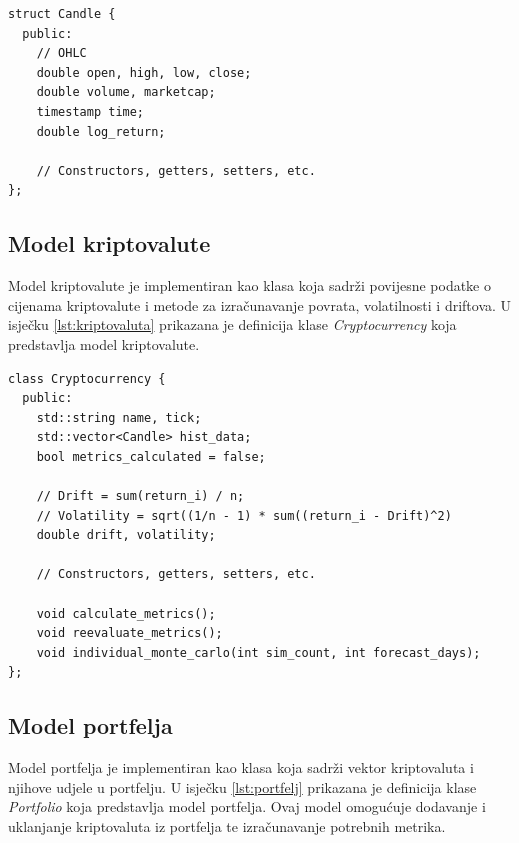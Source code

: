 \documentclass[zavrsnirad, upload]{fer}
\begin{document}
\begin{lstlisting}[caption={Struktura \emph{candle} koja sadrži povijesne
podatke o cijenama kriptovaluta}, label={lst:candle}]
struct Candle {
  public:
    // OHLC
    double open, high, low, close;
    double volume, marketcap;
    timestamp time;
    double log_return;

    // Constructors, getters, setters, etc.
};
\end{lstlisting}

\subsection{Model kriptovalute}
\label{sek:model_kriptovalute}
Model kriptovalute je implementiran kao klasa koja
sadrži povijesne podatke o cijenama kriptovalute
i metode za izračunavanje povrata, volatilnosti
i driftova. U isječku \ref{lst:kriptovaluta} prikazana je definicija
klase \emph{Cryptocurrency} koja predstavlja model kriptovalute.
\begin{lstlisting}[caption={Model kriptovalute}, label={lst:kriptovaluta}]
class Cryptocurrency {
  public:
    std::string name, tick;
    std::vector<Candle> hist_data;
    bool metrics_calculated = false;

    // Drift = sum(return_i) / n;
    // Volatility = sqrt((1/n - 1) * sum((return_i - Drift)^2)
    double drift, volatility;

    // Constructors, getters, setters, etc.

    void calculate_metrics();
    void reevaluate_metrics();
    void individual_monte_carlo(int sim_count, int forecast_days);
};
\end{lstlisting}

\subsection{Model portfelja}
\label{sek:model_portfelja}
Model portfelja je implementiran kao klasa koja
sadrži vektor kriptovaluta i njihove udjele u portfelju.
U isječku \ref{lst:portfelj} prikazana je definicija klase \emph{Portfolio}
koja predstavlja model portfelja. Ovaj model omogućuje dodavanje i
uklanjanje kriptovaluta iz portfelja te izračunavanje potrebnih metrika.
\end{document}
